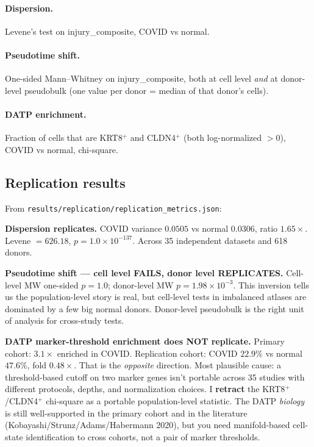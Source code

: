 \documentclass[11pt]{article}
\begin{document}
\paragraph{Dispersion.} Levene's test on injury\_composite, COVID vs normal.
\paragraph{Pseudotime shift.} One-sided Mann--Whitney on injury\_composite,
both at cell level \emph{and} at donor-level pseudobulk (one value per donor
= median of that donor's cells).
\paragraph{DATP enrichment.} Fraction of cells that are KRT8$^+$ and
CLDN4$^+$ (both log-normalized $>0$), COVID vs normal, chi-square.

\subsection{Replication results}

From \texttt{results/replication/replication\_metrics.json}:

\begin{resultbox}
\textbf{Dispersion replicates.} COVID variance $0.0505$ vs normal $0.0306$,
ratio $1.65\times$. Levene $= 626.18$, $p = 1.0\times 10^{-137}$. Across
35 independent datasets and 618 donors.
\end{resultbox}

\begin{resultbox}
\textbf{Pseudotime shift --- cell level FAILS, donor level REPLICATES.}
Cell-level MW one-sided $p = 1.0$; donor-level MW $p = 1.98\times 10^{-3}$.
This inversion tells us the population-level story is real, but cell-level
tests in imbalanced atlases are dominated by a few big normal donors.
Donor-level pseudobulk is the right unit of analysis for cross-study
tests.
\end{resultbox}

\begin{pitfall}
\textbf{DATP marker-threshold enrichment does NOT replicate.}
Primary cohort: $3.1\times$ enriched in COVID.
Replication cohort: COVID $22.9\%$ vs normal $47.6\%$, fold $0.48\times$.
That is the \emph{opposite} direction. Most plausible cause: a
threshold-based cutoff on two marker genes isn't portable across 35 studies
with different protocols, depths, and normalization choices. I
\textbf{retract} the KRT8$^+$/CLDN4$^+$ chi-square as a portable
population-level statistic. The DATP \emph{biology} is still well-supported
in the primary cohort and in the literature (Kobayashi/Strunz/Adams/Habermann
2020), but you need manifold-based cell-state identification to cross
cohorts, not a pair of marker thresholds.
\end{pitfall}
\end{document}
